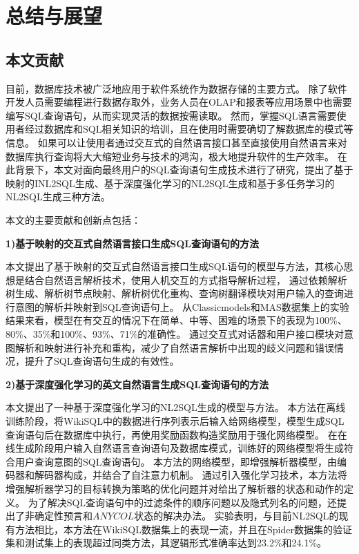 \chapter{总结与展望}
\label{chap:conculution}
\section{本文贡献}

目前，数据库技术被广泛地应用于软件系统作为数据存储的主要方式。
除了软件开发人员需要编程进行数据存取外，业务人员在OLAP和报表等应用场景中也需要编写SQL查询语句，从而实现灵活的数据按需读取。
然而，掌握SQL语言需要使用者经过数据库和SQL相关知识的培训，且在使用时需要确切了解数据库的模式等信息。
如果可以让使用者通过交互式的自然语言接口甚至直接使用自然语言来对数据库执行查询将大大缩短业务与技术的鸿沟，极大地提升软件的生产效率。
在此背景下，本文对面向最终用户的SQL查询语句生成技术进行了研究，提出了基于映射的INL2SQL生成、基于深度强化学习的NL2SQL生成和基于多任务学习的NL2SQL生成三种方法。

本文的主要贡献和创新点包括：

\textbf{1)基于映射的交互式自然语言接口生成SQL查询语句的方法}

本文提出了基于映射的交互式自然语言接口生成SQL语句的模型与方法，其核心思想是结合自然语言解析技术，使用人机交互的方式指导解析过程，
通过依赖解析树生成、解析树节点映射、解析树优化重构、查询树翻译模块对用户输入的查询进行意图的解析并映射到SQL查询语句上。
从Classicmodels和MAS数据集上的实验结果来看，模型在有交互的情况下在简单、中等、困难的场景下的表现为100\%、80\%、35\%和100\%、93\%、71\%的准确性。
通过交互式对话器和用户接口模块对意图解析和映射进行补充和重构，减少了自然语言解析中出现的歧义问题和错误情况，提升了SQL查询语句生成的有效性。


\textbf{2)基于深度强化学习的英文自然语言生成SQL查询语句的方法}

本文提出了一种基于深度强化学习的NL2SQL生成的模型与方法。
本方法在离线训练阶段，将WikiSQL中的数据进行序列表示后输入给网络模型，模型生成SQL查询语句后在数据库中执行，再使用奖励函数构造奖励用于强化网络模型。
在在线生成阶段用户输入自然语言查询语句及数据库模式，训练好的网络模型将生成符合用户查询意图的SQL查询语句。
本方法的网络模型，即增强解析器模型，由编码器和解码器构成，并结合了自注意力机制。
通过引入强化学习技术，本方法将增强解析器学习的目标转换为策略的优化问题并对给出了解析器的状态和动作的定义。
为了解决SQL查询语句中的过滤条件的顺序问题以及隐式列名的问题，还提出了非确定性预言和$ANYCOL$状态的解决办法。
实验表明，与目前NL2SQL的现有方法相比，本方法在WikiSQL数据集上的表现一流，并且在Spider数据集的验证集和测试集上的表现超过同类方法，其逻辑形式准确率达到23.2\%和24.1\%。


